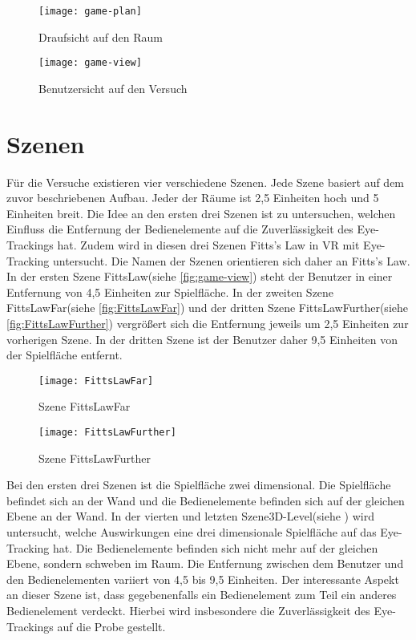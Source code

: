 \begin{figure}[!htbp]
	\centering
	\texttt{[image: game-plan]}
	\caption[Draufsicht auf den Raum]{Draufsicht auf den Raum}
	\label{fig:game-plan}
\end{figure}

\begin{figure}[!htbp]
\centering
\texttt{[image: game-view]}
\caption[Benutzersicht auf den Versuch]{Benutzersicht auf den Versuch}
\label{fig:game-view}
\end{figure}

\section{Szenen}
Für die Versuche existieren vier verschiedene Szenen. Jede Szene basiert auf dem zuvor beschriebenen Aufbau. Jeder der Räume ist 2,5 Einheiten hoch und 5 Einheiten breit. Die Idee an den ersten drei Szenen ist zu untersuchen, welchen Einfluss die Entfernung der Bedienelemente auf die Zuverlässigkeit des Eye-Trackings hat. Zudem wird in diesen drei Szenen Fitts's Law in \ac{VR} mit Eye-Tracking untersucht. Die Namen der Szenen orientieren sich daher an Fitts's Law. In der ersten Szene \glqq FittsLaw\grqq (siehe \autoref{fig:game-view}) steht der Benutzer in einer Entfernung von 4,5 Einheiten zur Spielfläche. In der zweiten Szene \glqq FittsLawFar\grqq (siehe \autoref{fig:FittsLawFar}) und der dritten Szene \glqq FittsLawFurther\grqq (siehe \autoref{fig:FittsLawFurther}) vergrößert sich die Entfernung jeweils um 2,5 Einheiten zur vorherigen Szene. In der dritten Szene ist der Benutzer daher 9,5 Einheiten von der Spielfläche entfernt. 

\begin{figure}[!htbp]
	\centering
	\texttt{[image: FittsLawFar]}
	\caption[Szene FittsLawFar]{Szene FittsLawFar}
	\label{fig:FittsLawFar}
\end{figure}

\begin{figure}[!htbp]
	\centering
	\texttt{[image: FittsLawFurther]}
	\caption[Szene FittsLawFurther]{Szene FittsLawFurther}
	\label{fig:FittsLawFurther}
\end{figure}

Bei den ersten drei Szenen ist die Spielfläche zwei dimensional. Die Spielfläche befindet sich an der Wand und die Bedienelemente befinden sich auf der gleichen Ebene an der Wand. In der vierten und letzten Szene\glqq 3D-Level\grqq (siehe ) wird untersucht, welche Auswirkungen eine drei dimensionale Spielfläche auf das Eye-Tracking hat. Die Bedienelemente befinden sich nicht mehr auf der gleichen Ebene, sondern schweben im Raum. Die Entfernung zwischen dem Benutzer und den Bedienelementen variiert von 4,5 bis 9,5 Einheiten. Der interessante Aspekt an dieser Szene ist, dass gegebenenfalls ein Bedienelement zum Teil ein anderes Bedienelement verdeckt. Hierbei wird insbesondere die Zuverlässigkeit des Eye-Trackings auf die Probe gestellt. 

